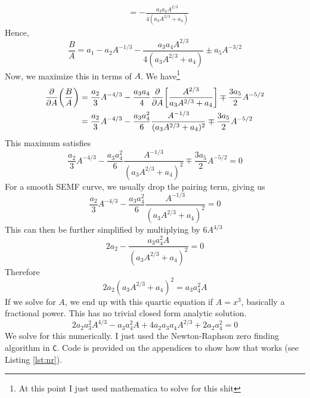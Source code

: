 \documentclass[12pt,a4paper]{article}
\begin{document}
\begin{solution_pset}
\begin{align}
				&= -\frac{a_3a_4A^{2/3} }{4 (a_3 A^{2/3} + a_4)} 
		\end{align}
		Hence,
		\begin{equation}
			\frac{B}{A} = 
			  a_1 
			- a_2 A^{-1/3} 
			- \frac{a_3a_4A^{2/3} }{4 (a_3 A^{2/3} + a_4)} 
			\pm a_5 A^{-3/2} 
		\end{equation}
		Now, we maximize this in terms of $A$. We have\footnote{At this point I just used mathematica to solve for this shit}
		\begin{align}
			\pdv{}{A}\qty(\frac{B}{A})  
				&= 
					\frac{a_2}{3} A^{-4/3} 
					- \frac{a_3a_4}{4}\pdv{}{A}\qty[\frac{A^{2/3}}{a_3A^{2/3}+a_4}] 
					\mp \frac{3a_5}{2} A^{-5/2}  \\ 
				&= 
					\frac{a_2}{3} A^{-4/3} 
					- \frac{a_3a_4^2}{6}  \frac{A^{-1/3}}{(a_3A^{2/3}+a_4)^2} 
					\mp \frac{3a_5}{2} A^{-5/2}   
		\end{align}
		This maximum satisfies
		\begin{equation}
			\frac{a_2}{3} A^{-4/3} 
			- \frac{a_3a_4^2}{6}  \frac{A^{-1/3}}{(a_3A^{2/3}+a_4)^2} 
			\mp \frac{3a_5}{2} A^{-5/2}   
			= 0
		\end{equation}
		For a smooth SEMF curve, we usually drop the pairing term, giving us
		\begin{equation}
			\frac{a_2}{3} A^{-4/3} 
			- \frac{a_3a_4^2}{6}  \frac{A^{-1/3}}{(a_3A^{2/3}+a_4)^2} 
			= 0
		\end{equation}
		This can then be further simplified by multiplying by $6A^{4/3}$
		\begin{equation}
		    2a_2 - \frac{a_3a_4^2 A}{(a_3A^{2/3}+a_4)^2} = 0
		\end{equation}
		Therefore
		\begin{equation}
			2a_2(a_3A^{2/3} + a_4)^2 = a_3 a_4^2 A
		\end{equation}
		If we solve for $A$, we end up with this quartic equation if $A=x^3$, basically a fractional power.
		This has no trivial closed form analytic solution.
		\begin{equation}
			2a_2 a_3^2 A^{4/3} - a_3 a_4^2 A + 4a_2 a_3 a_4 A^{2/3} + 2a_2a_4^2 = 0
		\end{equation}
		We solve for this numerically. I just used the Newton-Raphson zero finding algorithm in \texttt{C}. 
		Code is provided on the appendices to show how that works (see Listing \ref{lst:nr}). 


\end{solution_pset}
\end{document}
